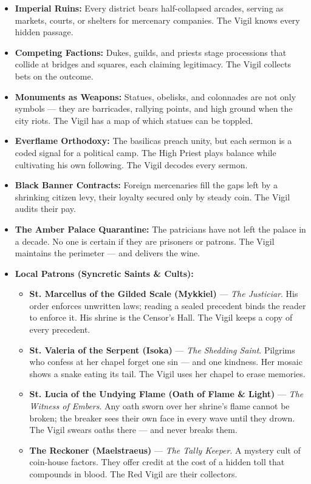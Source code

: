 \begin{itemize}
\item \textbf{Imperial Ruins:} Every district bears half-collapsed arcades, serving as markets, courts, or shelters for mercenary companies. The Vigil knows every hidden passage.
\item \textbf{Competing Factions:} Dukes, guilds, and priests stage processions that collide at bridges and squares, each claiming legitimacy. The Vigil collects bets on the outcome.
\item \textbf{Monuments as Weapons:} Statues, obelisks, and colonnades are not only symbols --- they are barricades, rallying points, and high ground when the city riots. The Vigil has a map of which statues can be toppled.
\item \textbf{Everflame Orthodoxy:} The basilicas preach unity, but each sermon is a coded signal for a political camp. The High Priest plays balance while cultivating his own following. The Vigil decodes every sermon.
\item \textbf{Black Banner Contracts:} Foreign mercenaries fill the gaps left by a shrinking citizen levy, their loyalty secured only by steady coin. The Vigil audits their pay.
\item \textbf{The Amber Palace Quarantine:} The patricians have not left the palace in a decade. No one is certain if they are prisoners or patrons. The Vigil maintains the perimeter --- and delivers the wine.
\item \textbf{Local Patrons (Syncretic Saints \& Cults):}
  \begin{itemize}
    \item \textbf{St. Marcellus of the Gilded Scale (Mykkiel)} --- \textit{The Justiciar}. His order enforces unwritten laws; reading a sealed precedent binds the reader to enforce it. His shrine is the Censor's Hall. The Vigil keeps a copy of every precedent.
    \item \textbf{St. Valeria of the Serpent (Isoka)} --- \textit{The Shedding Saint}. Pilgrims who confess at her chapel forget one sin --- and one kindness. Her mosaic shows a snake eating its tail. The Vigil uses her chapel to erase memories.
    \item \textbf{St. Lucia of the Undying Flame (Oath of Flame \& Light)} --- \textit{The Witness of Embers}. Any oath sworn over her shrine's flame cannot be broken; the breaker sees their own face in every wave until they drown. The Vigil swears oaths there --- and never breaks them.
    \item \textbf{The Reckoner (Maelstraeus)} --- \textit{The Tally Keeper}. A mystery cult of coin-house factors. They offer credit at the cost of a hidden toll that compounds in blood. The Red Vigil are their collectors.

\end{itemize}
\end{itemize}
